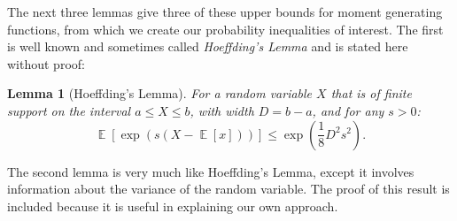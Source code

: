 \documentclass[]{interact}
\DeclareMathOperator{\E}{\mathbb{E}}
\theoremstyle{plain}%
\newtheorem{lemma}[Theorem]{Lemma}
\theoremstyle{definition}
\theoremstyle{remark}
\begin{document}
The next three lemmas give three of these upper bounds for moment generating functions, from which we create our probability inequalities of interest.
The first is well known and sometimes called \textit{Hoeffding's Lemma} \citep{hoeffding1} and is stated here without proof:

\begin{lemma}[Hoeffding's Lemma]\label{expectation0}
For a random variable $X$ that is of finite support on the interval $a\le X\le b$, with width $D=b-a$, and for any $s>0$:
\[
\E\left[\exp(s(X-\E[x]))\right] \le\exp\left(\frac{1}{8}D^2s^2\right).
\nonumber
\]
\end{lemma}
\noindent
The second lemma is very much like Hoeffding's Lemma, except it involves information about the variance of the random variable.
The proof of this result is included because it is useful in explaining our own approach.
\end{document}
